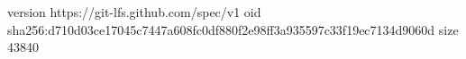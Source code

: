 version https://git-lfs.github.com/spec/v1
oid sha256:d710d03ce17045c7447a608fc0df880f2e98ff3a935597c33f19ec7134d9060d
size 43840
